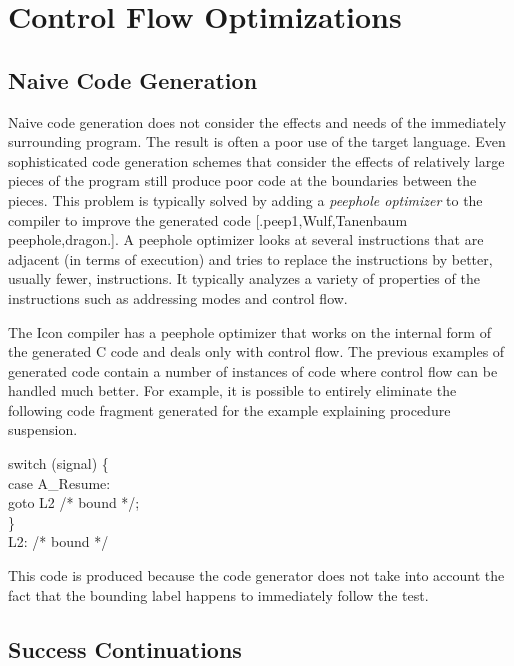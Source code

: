 \chapter{Control Flow Optimizations}

\section{Naive Code Generation}

Naive code generation does not consider the effects and needs of the
immediately surrounding program. The result is often a poor use of the
target language. Even sophisticated code generation schemes that
consider the effects of relatively large pieces of the program still
produce poor code at the boundaries between the pieces. This problem
is typically solved by adding a \textit{peephole optimizer} to the
compiler to improve the generated code [.peep1,Wulf,Tanenbaum
peephole,dragon.]. A peephole optimizer looks at several instructions
that are adjacent (in terms of execution) and tries to replace the
instructions by better, usually fewer, instructions. It typically
analyzes a variety of properties of the instructions such as
addressing modes and control flow.

The Icon compiler has a peephole optimizer that works on the internal
form of the generated C code and deals only with control flow. The
previous examples of generated code contain a number of instances of
code where control flow can be handled much better. For example, it is
possible to entirely eliminate the following code fragment generated
for the example explaining procedure suspension.

\goodbreak
\begin{iconcode}
\>switch (signal) \{\\
\>\>case A\_Resume:\\
\>\>\>goto L2 /* bound */;\\
\>\}\\
L2: /* bound */\\
\end{iconcode}

\noindent
This code is produced because the code generator does not take into
account the fact that the bounding label happens to immediately follow
the test.


\section{Success Continuations}

